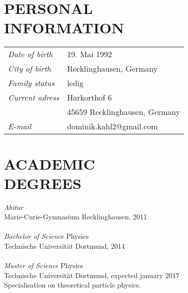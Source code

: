 \documentclass[margin,12pt]{res} %
\begin{document}
\hspace{0.2in}
\begin{resume}

 
\section{PERSONAL \\ INFORMA\-TION}  
\begin{tabular}{ll}
{\sl Date of birth}& 19. Mai 1992 \\
{\sl City of birth}& Recklinghausen, Germany		  \\
{\sl Family status}& ledig		\\
{\sl Current adress}& Harkorthof 6 \\ &45659 Recklinghausen, Germany \\
{\sl E-mail} &dominik.kahl2@gmail.com
\end{tabular}

\section{ACADEMIC \\ DEGREES}
{\sl Abitur} \\
Marie-Curie-Gymnasium Recklinghausen, 2011\\\\
{\sl Bachelor of Science} Physics \\
Technische Universität Dortmund, 2014 
\\\\
{\sl Master of Science} Physics \\
Technische Universität Dortmund, expected january 2017\\
Specialisation on theoretical particle physics.


\end{resume}
\end{document}
